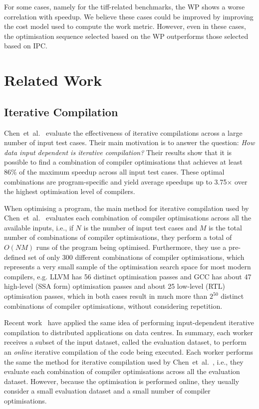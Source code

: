 \documentclass[sigplan,10pt]{acmart}
\newcommand{\etal}{et~al.}
\newcommand{\itercomp}{{iterative compilation}}
\newcommand{\IterComp}{{Iterative Compilation}}
\begin{document}
For some cases, namely for the tiff-related benchmarks, the WP shows a worse correlation with speedup.
We believe these cases could be improved by improving the cost model used to compute the work metric.
However, even in these cases, the optimisation sequence selected based on the WP outperforms those selected based on IPC.


\section{Related Work}

\subsection{{\IterComp}}

Chen~\etal~\cite{chen10,chen12a} evaluate the effectiveness of iterative compilations across a large number of input test cases.
Their main motivation is to answer the question:
\textit{How data input dependent is {\itercomp}?}
Their results show that it is possible to find a combination of compiler optimisations that achieves at least 86\% of the maximum speedup across all input test cases.
These optimal combinations are program-specific and yield average speedups up to 3.75$\times$ over the highest optimisation level of compilers.

When optimising a program, the main method for {\itercomp} used by Chen~\etal~\cite{chen10,chen12a} evaluates each combination of compiler optimisations across all the available inputs, i.e., if $N$ is the number of input test cases and $M$ is the total number of combinations of compiler optimisations, they perform a total of $O(NM)$ runs of the program being optimised.
Furthermore, they use a pre-defined set of only 300 different combinations of compiler optimisations, which represents a very small sample of the optimisation search space for most modern compilers, e.g.
LLVM has 56 distinct optimisation passes and GCC has about 47 high-level (SSA form) optimisation passes and about 25 low-level (RTL) optimisation passes, which in both cases result in much more than $2^{50}$ distinct combinations of compiler optimisations, without considering repetition.

Recent work~\cite{chen12b,fang15} have applied the same idea of performing input-dependent {\itercomp} to distributed applications on data centres.
In summary, each worker receives a subset of the input dataset, called the evaluation dataset, to perform an \textit{online} {\itercomp} of the code being executed.
Each worker performs the same the method for {\itercomp} used by Chen~\etal~\cite{chen10,chen12a}, i.e., they evaluate each combination of compiler optimisations across all the evaluation dataset.
However, because the optimisation is performed online, they usually consider a small evaluation dataset and a small number of compiler optimisations.
\end{document}
